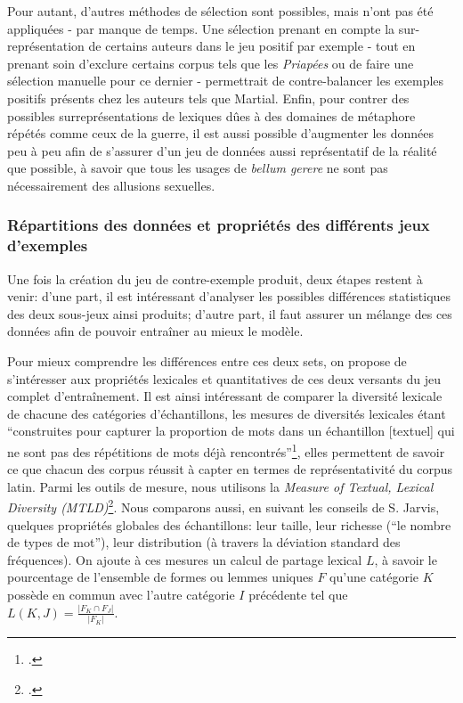 Pour autant, d'autres méthodes de sélection sont possibles, mais n'ont pas été appliquées - par manque de temps. Une sélection prenant en compte la sur-représentation de certains auteurs dans le jeu positif par exemple - tout en prenant soin d'exclure certains corpus tels que les \textit{Priapées} ou de faire une sélection manuelle pour ce dernier - permettrait de contre-balancer les exemples positifs présents chez les auteurs tels que Martial. Enfin, pour contrer des possibles surreprésentations de lexiques dûes à des domaines de métaphore répétés comme ceux de la guerre, il est aussi possible d'augmenter les données peu à peu afin de s'assurer d'un jeu de données aussi représentatif de la réalité que possible, à savoir que tous les usages de \textit{bellum gerere} ne sont pas nécessairement des allusions sexuelles.

\subsubsection{Répartitions des données et propriétés des différents jeux d'exemples}

Une fois la création du jeu de contre-exemple produit, deux étapes restent à venir: d'une part, il est intéressant d'analyser les possibles différences statistiques des deux sous-jeux ainsi produits; d'autre part, il faut assurer un mélange des ces données afin de pouvoir entraîner au mieux le modèle.

Pour mieux comprendre les différences entre ces deux sets, on propose de s'intéresser aux propriétés lexicales et quantitatives de ces deux versants du jeu complet d'entraînement. Il est ainsi intéressant de comparer la diversité lexicale de chacune des catégories d'échantillons, les mesures de diversités lexicales étant \enquote{construites pour capturer la proportion de mots dans un échantillon [textuel] qui ne sont pas des répétitions de mots déjà rencontrés}\footcite[p. 44]{jarvis_capturing_2019}, elles permettent de savoir ce que chacun des corpus réussit à capter en termes de représentativité du corpus latin. Parmi les outils de mesure, nous utilisons la \textit{Measure of Textual, Lexical Diversity (MTLD)}\footcite{mccarthy_assessment_2005}. Nous comparons aussi, en suivant les conseils de S. Jarvis, quelques propriétés globales des échantillons: leur taille, leur richesse (\enquote{le nombre de types de mot}), leur distribution (à travers la déviation standard des fréquences). On ajoute à ces mesures un calcul de partage lexical $L$, à savoir le pourcentage de l'ensemble de formes ou lemmes uniques $F$ qu'une catégorie $K$ possède en commun avec l'autre catégorie $I$ précédente tel que $L(K, J) = \frac{|F_{K} \cap F_{J}|}{|F_{K}|}$. 

